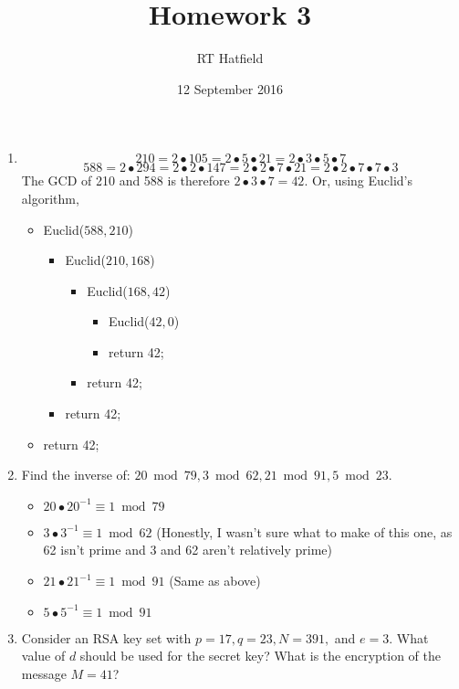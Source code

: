 \documentclass{article}
\title{Homework 3}
\author{RT Hatfield}
\date{12 September 2016}
\begin{document}
\maketitle
\begin{enumerate}
    \item $$210 = 2 \bullet 105 = 2 \bullet 5 \bullet 21 = 2 \bullet 3 \bullet 5 \bullet 7$$
        $$588 = 2 \bullet 294 = 2 \bullet 2 \bullet 147 = 2 \bullet 2 \bullet 7 \bullet 21 = 2 \bullet 2 \bullet 7 \bullet 7 \bullet 3$$
        The GCD of 210 and 588 is therefore $2 \bullet 3 \bullet 7 = 42$.  Or, using Euclid's algorithm,
        \begin{itemize}
            \item Euclid($588, 210$) 
            \begin{itemize}
                \item Euclid($210, 168$)
                \begin{itemize}
                    \item Euclid($168, 42$)
                    \begin{itemize}
                        \item Euclid($42, 0$)
                        \item return 42;
                    \end{itemize}
                    \item return 42;
                \end{itemize}
                \item return 42;
            \end{itemize}
            \item return 42;
        \end{itemize}
    \item Find the inverse of: $20 \bmod 79, 3 \bmod 62, 21 \bmod 91, 5 \bmod 23$.
        \begin{itemize}
            \item $20 \bullet 20^{-1} \equiv 1 \bmod 79$
            \item $3 \bullet 3^{-1} \equiv 1 \bmod 62$ (Honestly, I wasn't sure what to make of this one, as 62 isn't prime and 3 and 62 aren't relatively prime)
            \item $21 \bullet 21^{-1} \equiv 1 \bmod 91$ (Same as above)
            \item $5 \bullet 5^{-1} \equiv 1 \bmod 91$
        \end{itemize}
    \item Consider an RSA key set with $p = 17, q = 23, N = 391,$ and $e = 3$. What value
of $d$ should be used for the secret key? What is the encryption of the message $M = 41$?
   

\end{enumerate}
\end{document}
